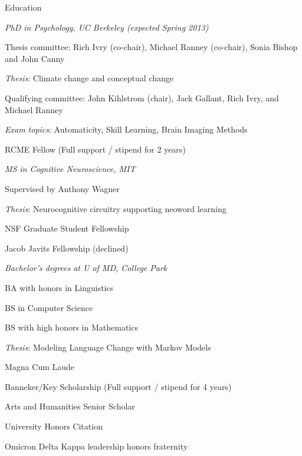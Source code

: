 \begin{rubric}{Education}

\entry*[2007--present] \emph{PhD in Psychology, UC Berkeley (expected Spring
    2013)}
\par Thesis committee: Rich Ivry (co-chair), Michael Ranney (co-chair), Sonia
Bishop and John Canny
\par \emph{Thesis}: Climate change and conceptual change
\par Qualifying committee: John Kihlstrom (chair), Jack Gallant, Rich Ivry, and
Michael Ranney
\par \emph{Exam topics}: Automaticity, Skill Learning, Brain Imaging Methods
\par RCME Fellow (Full support / stipend for 2 years)


\entry*[1999--2002] \emph{MS in Cognitive Neuroscience, MIT}
\par Supervised by Anthony Wagner
\par \emph{Thesis}: Neurocognitive circuitry supporting neoword learning
\par NSF Graduate Student Fellowship
\par Jacob Javits Fellowship (declined)




\entry*[1995--1999] \emph{Bachelor's degrees at U of MD, College Park}
\par BA with honors in Linguistics
\par BS in Computer Science
\par BS with high honors in Mathematics
\par \emph{Thesis}: Modeling Language Change with Markov Models
\par Magna Cum Laude
\par Banneker/Key Scholarship (Full support / stipend for 4 years)
\par Arts and Humanities Senior Scholar
\par University Honors Citation
\par Omicron Delta Kappa leadership honors fraternity

 

\end{rubric}
